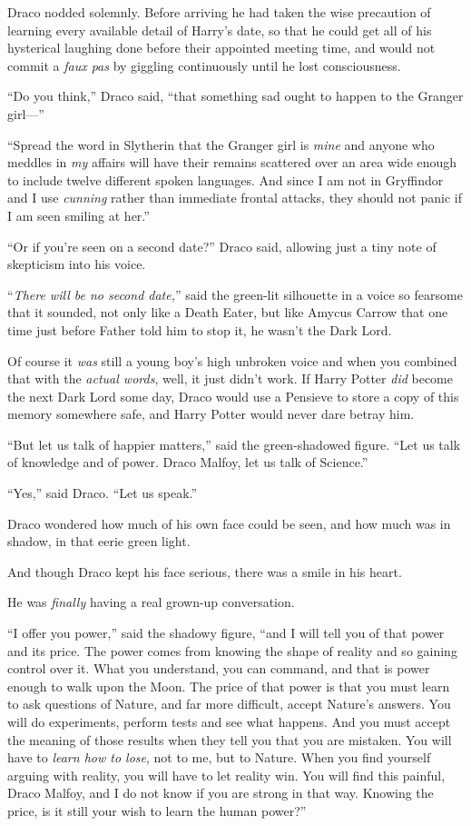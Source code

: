 Draco nodded solemnly. Before arriving he had taken the wise precaution of learning every available detail of Harry’s date, so that he could get all of his hysterical laughing done before their appointed meeting time, and would not commit a \emph{faux pas} by giggling continuously until he lost consciousness.

“Do you think,” Draco said, “that something sad ought to happen to the Granger girl—”

“Spread the word in Slytherin that the Granger girl is \emph{mine} and anyone who meddles in \emph{my} affairs will have their remains scattered over an area wide enough to include twelve different spoken languages. And since I am not in Gryffindor and I use \emph{cunning} rather than immediate frontal attacks, they should not panic if I am seen smiling at her.”

“Or if you’re seen on a second date?” Draco said, allowing just a tiny note of skepticism into his voice.

“\emph{There will be no second date,}” said the green-lit silhouette in a voice so fearsome that it sounded, not only like a Death Eater, but like Amycus Carrow that one time just before Father told him to stop it, he wasn’t the Dark Lord.

Of course it \emph{was} still a young boy’s high unbroken voice and when you combined that with the \emph{actual words}, well, it just didn’t work. If Harry Potter \emph{did} become the next Dark Lord some day, Draco would use a Pensieve to store a copy of this memory somewhere safe, and Harry Potter would never dare betray him.

“But let us talk of happier matters,” said the green-shadowed figure. “Let us talk of knowledge and of power. Draco Malfoy, let us talk of Science.”

“Yes,” said Draco. “Let us speak.”

Draco wondered how much of his own face could be seen, and how much was in shadow, in that eerie green light.

And though Draco kept his face serious, there was a smile in his heart.

He was \emph{finally} having a real grown-up conversation.

“I offer you power,” said the shadowy figure, “and I will tell you of that power and its price. The power comes from knowing the shape of reality and so gaining control over it. What you understand, you can command, and that is power enough to walk upon the Moon. The price of that power is that you must learn to ask questions of Nature, and far more difficult, accept Nature’s answers. You will do experiments, perform tests and see what happens. And you must accept the meaning of those results when they tell you that you are mistaken. You will have to \emph{learn how to lose}, not to me, but to Nature. When you find yourself arguing with reality, you will have to let reality win. You will find this painful, Draco Malfoy, and I do not know if you are strong in that way. Knowing the price, is it still your wish to learn the human power?”

